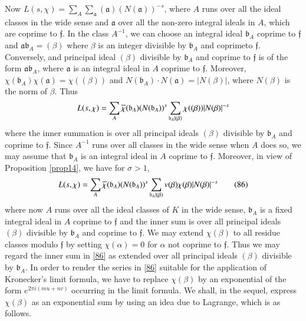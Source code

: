 Now
$L(s,\chi)=\sum\limits_{A}\sum_{\mathfrak{a}}(\mathfrak{a})(N(\mathfrak{a}))^{-s}$,
where $A$ runs over all the ideal classes in the wide sense and
$\mathfrak{a}$ over all the non-zero integral ideals in $A$, which are
coprime to $\mathfrak{f}$. In the class $A^{-1}$, we can choose an
integral ideal $\mathfrak{b}_{A}$ coprime to $\mathfrak{f}$ and
$\mathfrak{ab}_{A}=(\beta)$ where $\beta$ is an integer divisible by
$\mathfrak{b}_{A}$ and coprime\pageoriginale to
$\mathfrak{f}$. Conversely, and principal ideal $(\beta)$ divisible by
$\mathfrak{b}_{A}$ and coprime to $\mathfrak{f}$ is of the form
$\mathfrak{ab}_{A}$, where $\mathfrak{a}$ is an integral ideal in $A$
coprime to $\mathfrak{f}$. Moreover,
$\chi(\mathfrak{b}_{A})\chi(\mathfrak{a})=\chi((\beta))$ and
$N(\mathfrak{b}_{A})\cdot N(\mathfrak{a})=|N(\beta)|$, where
$N(\beta)$ is the norm of $\beta$. Thus
$$
L(s,\chi)=\sum_{A}\overline{\chi}(\mathfrak{b}_{A})(N(\mathfrak{b}_{A}))^{s}\sum_{\mathfrak{b}_{A}|(\beta)}\chi((\beta))|N(\beta)|^{-s}
$$
where the inner summation is over all principal ideals $(\beta)$
divisible by $\mathfrak{b}_{A}$ and coprime to $\mathfrak{f}$. Since
$A^{-1}$ runs over all classes in the wide sense when $A$ does so, we
may assume that $\mathfrak{b}_{A}$ is an integral ideal in $A$ coprime
to $\mathfrak{f}$. Moreover, in view of Proposition \ref{prop14}, we
have for $\sigma>1$,
\begin{equation*}
L(s,\chi)=\sum_{A}\overline{\chi}(\mathfrak{b}_{A})(N(\mathfrak{b}_{A}))^{s}\sum_{\mathfrak{b}_{A}|(\beta)}v(\beta)\chi(\beta)|N(\beta)|^{-s}\tag{86}\label{86} 
\end{equation*}
where now $A$ runs over all the ideal classes of $K$ in the wide
sense, $\mathfrak{b}_{A}$ is a fixed integral ideal in $A$ coprime to
$\mathfrak{f}$ and the inner sum is over all principal ideals
$(\beta)$ divisible by $\mathfrak{b}_{A}$ and coprime to
$\mathfrak{f}$. We may extend $\chi(\beta)$ to all residue classes
modulo $\mathfrak{f}$ by setting $\chi(\alpha)=0$ for $\alpha$ not
coprime to $\mathfrak{f}$. Thus we may regard the inner sum in
\eqref{86} as extended over all principal ideals $(\beta)$ divisible
by $\mathfrak{b}_{A}$. In order to render the series in \eqref{86}
suitable for the application of Kronecker's limit formula, we have to
replace $\chi(\beta)$ by an exponential of the form $e^{2\pi
  i(mu+nv)}$ occurring in the limit formula. We shall, in the sequel,
express $\chi(\beta)$ as an exponential sum by using an idea due to
Lagrange, which is as follows.

